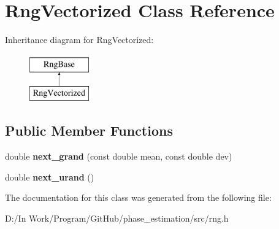 \hypertarget{classRngVectorized}{}\section{Rng\+Vectorized Class Reference}
\label{classRngVectorized}
Inheritance diagram for Rng\+Vectorized\+:\begin{figure}[H]
\begin{center}
\leavevmode
\includegraphics[height=2.000000cm]{classRngVectorized}
\end{center}
\end{figure}
\subsection*{Public Member Functions}
\begin{DoxyCompactItemize}
\item 
\hypertarget{classRngVectorized_a7a30dbbb27bd21f8d07731efd077a135}{}double {\bfseries next\+\_\+grand} (const double mean, const double dev)\label{classRngVectorized_a7a30dbbb27bd21f8d07731efd077a135}

\item 
\hypertarget{classRngVectorized_a82a1c6c3e3e70487e61c70c0c0920a34}{}double {\bfseries next\+\_\+urand} ()\label{classRngVectorized_a82a1c6c3e3e70487e61c70c0c0920a34}

\end{DoxyCompactItemize}


The documentation for this class was generated from the following file\+:\begin{DoxyCompactItemize}
\item 
D\+:/\+In Work/\+Program/\+Git\+Hub/phase\+\_\+estimation/src/rng.\+h\end{DoxyCompactItemize}
